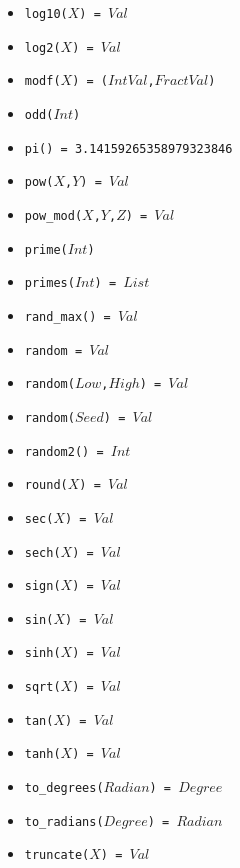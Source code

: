 \documentclass[10pt]{article}
\begin{document}
\begin{multicols}{2}
\begin{scriptsize}
\begin{itemize}
   \item \texttt{log10($X$) = $Val$} 
   \item \texttt{log2($X$) = $Val$} 
   \item \texttt{modf($X$) = ($IntVal$,$FractVal$)} 
   \item \texttt{odd($Int$)} 
   \item \texttt{pi() = 3.14159265358979323846} 
   \item \texttt{pow($X$,$Y$) = $Val$}
   \item \texttt{pow\_mod($X$,$Y$,$Z$) = $Val$}
   \item \texttt{prime($Int$)} 
   \item \texttt{primes($Int$) = $List$} 
   \item \texttt{rand\_max() = $Val$} 
   \item \texttt{random = $Val$} 
   \item \texttt{random($Low$,$High$) = $Val$} 
   \item \texttt{random($Seed$) = $Val$} 
   \item \texttt{random2() = $Int$} 
   \item \texttt{round($X$) = $Val$}
   \item \texttt{sec($X$) = $Val$}
   \item \texttt{sech($X$) = $Val$} 
   \item \texttt{sign($X$) = $Val$}  
   \item \texttt{sin($X$) = $Val$} 
   \item \texttt{sinh($X$) = $Val$} 
   \item \texttt{sqrt($X$) = $Val$} 
   \item \texttt{tan($X$) = $Val$}
   \item \texttt{tanh($X$) = $Val$} 
   \item \texttt{to\_degrees($Radian$) = $Degree$} 
   \item \texttt{to\_radians($Degree$) = $Radian$}
   \item \texttt{truncate($X$) = $Val$}  

\end{itemize}
\end{scriptsize}
\end{multicols}
\end{document}
